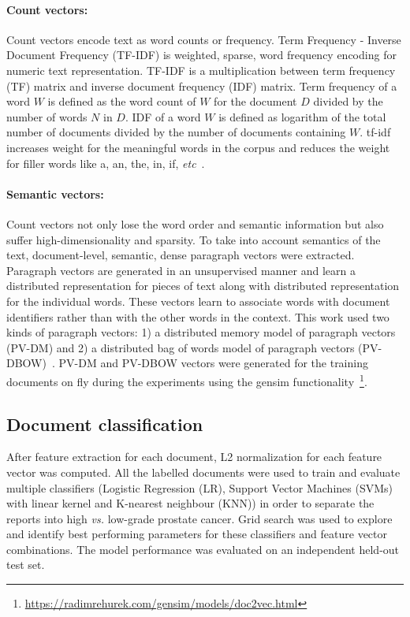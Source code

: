 \documentclass[runningheads]{llncs}
\begin{document}
\paragraph{Count vectors: } 
%
Count vectors encode text as word counts or frequency.
Term Frequency - Inverse Document Frequency (TF-IDF) is weighted, sparse, word frequency encoding for numeric text representation.
TF-IDF is a multiplication between term frequency (TF) matrix and inverse document frequency (IDF) matrix.
Term frequency of a word $W$ is defined as the word count of $W$ for the document $D$ divided by the number of words $N$ in $D$.
IDF of a word $W$ is defined as logarithm of the total number of documents divided by the number of documents containing $W$.
tf-idf increases weight for the meaningful words in the corpus and reduces the weight for filler words like a, an, the, in, if, \textit{etc}~\cite{dhrangadhariya2020exploiting}.
%
\paragraph{Semantic vectors: }
%
Count vectors not only lose the word order and semantic information but also suffer high-dimensionality and sparsity. 
To take into account semantics of the text, document-level, semantic, dense paragraph vectors were extracted.
Paragraph vectors are generated in an unsupervised manner and learn a distributed representation for pieces of text along with distributed representation for the individual words.
These vectors learn to associate words with document identifiers rather than with the other words in the context.
This work used two kinds of paragraph vectors: 1) a distributed memory model of paragraph vectors (PV-DM) and
2) a distributed bag of words model of paragraph vectors (PV-DBOW)~\cite{le2014distributed}.
PV-DM and PV-DBOW vectors were generated for the training documents on fly during the experiments using the gensim functionality~\footnote{\url{https://radimrehurek.com/gensim/models/doc2vec.html}}.
%
\subsection{Document classification}
\label{subsec:trainingeval}
%
After feature extraction for each document, L2 normalization for each feature vector was computed.
All the labelled documents were used to train and evaluate multiple classifiers (Logistic Regression (LR), Support Vector Machines (SVMs) with linear kernel and K-nearest neighbour (KNN)) in order to separate the reports into high \textit{vs.} low-grade prostate cancer.
Grid search was used to explore and identify best performing parameters for these classifiers and feature vector combinations.
The model performance was evaluated on an independent held-out test set.
%
\end{document}
